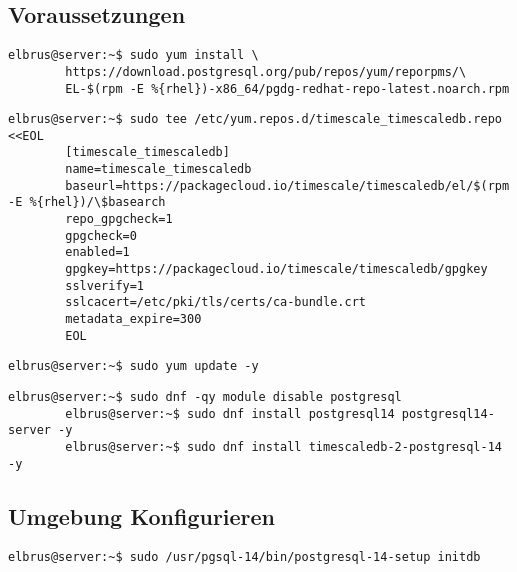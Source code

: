 	\subsection[dependencies]{Voraussetzungen}
	
	\lstset{style=commands}
	\begin{lstlisting}[caption={Hinzufügen des PostgreSQL Drittanbieter-Repository, um die neuesten PostgreSQL-Pakete zu erhalten.}]
		elbrus@server:~$ sudo yum install \
		https://download.postgresql.org/pub/repos/yum/reporpms/\
		EL-$(rpm -E %{rhel})-x86_64/pgdg-redhat-repo-latest.noarch.rpm
	\end{lstlisting}
	
	\lstset{style=commands}
	\begin{lstlisting}[caption={Erstellen des Timescale repository.}]
		elbrus@server:~$ sudo tee /etc/yum.repos.d/timescale_timescaledb.repo <<EOL
		[timescale_timescaledb]
		name=timescale_timescaledb
		baseurl=https://packagecloud.io/timescale/timescaledb/el/$(rpm -E %{rhel})/\$basearch
		repo_gpgcheck=1
		gpgcheck=0
		enabled=1
		gpgkey=https://packagecloud.io/timescale/timescaledb/gpgkey
		sslverify=1
		sslcacert=/etc/pki/tls/certs/ca-bundle.crt
		metadata_expire=300
		EOL
	\end{lstlisting}
	
	\lstset{style=commands}
	\begin{lstlisting}[caption={Updaten der lokalen Package-Liste.}]
		elbrus@server:~$ sudo yum update -y
	\end{lstlisting}
	
	\lstset{style=commands}
	\begin{lstlisting}[caption={Installieren von TimescaleDB.}]
		elbrus@server:~$ sudo dnf -qy module disable postgresql
		elbrus@server:~$ sudo dnf install postgresql14 postgresql14-server -y
		elbrus@server:~$ sudo dnf install timescaledb-2-postgresql-14 -y
	\end{lstlisting}
	\newpage
	
	\subsection[TimescaleDB konfigurieren]{Umgebung Konfigurieren}
	
	\lstset{style=commands}
	\begin{lstlisting}[caption={Initialisieren der Datenbank.}]
		elbrus@server:~$ sudo /usr/pgsql-14/bin/postgresql-14-setup initdb
	\end{lstlisting}
	
